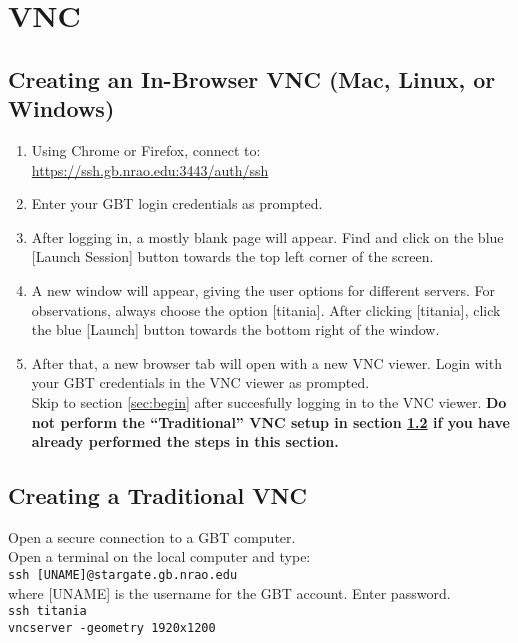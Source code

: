 \documentclass[11pt]{article}
\begin{document}

\section{VNC}\label{sec:vnc}  %

\subsection{Creating an In-Browser VNC (Mac, Linux, or Windows)}\label{ssec:newvnc} %
\begin{enumerate}
 \item Using Chrome or Firefox, connect to:\\ \href{https://ssh.gb.nrao.edu:3443/auth/ssh}{https://ssh.gb.nrao.edu:3443/auth/ssh}
 \item Enter your GBT login credentials as prompted.
 \item After logging in, a mostly blank page will appear. Find and click on the blue [Launch Session] button towards the top left corner of the screen.
 \item A new window will appear, giving the user options for different servers. For observations, always choose the option [titania]. After clicking [titania], click the blue [Launch] button towards the bottom right of the window.
\item After that, a new browser tab will open with a new VNC viewer. Login with your GBT credentials in the VNC viewer as prompted.\\

Skip to section \ref{sec:begin} after succesfully logging in to the VNC viewer. {\bfseries {Do not perform the ``Traditional'' VNC setup in section \ref{ssec:vnc} if you have already performed the steps in this section.}}
\end{enumerate}

\subsection{Creating a Traditional VNC}\label{ssec:vnc}  
Open a secure connection to a GBT computer. \\
Open a terminal on the local computer and type: \\
\indent\texttt{ssh [UNAME]@stargate.gb.nrao.edu} \\
\indent where [UNAME] is the username for the GBT account.  Enter password. \\
\indent\texttt{ssh titania \\
\indent vncserver -geometry 1920x1200}
\end{document}
